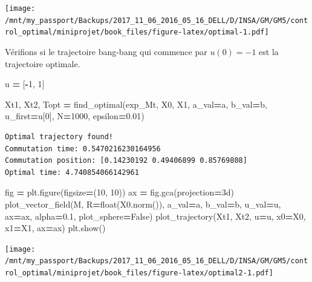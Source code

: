 \documentclass[
  french,
]{article}
\newenvironment{Shaded}{\begin{snugshade}}{\end{snugshade}}
\newcommand{\BuiltInTok}[1]{#1}
\newcommand{\DecValTok}[1]{\textcolor[rgb]{0.00,0.00,0.81}{#1}}
\newcommand{\FloatTok}[1]{\textcolor[rgb]{0.00,0.00,0.81}{#1}}
\newcommand{\NormalTok}[1]{#1}
\newcommand{\OperatorTok}[1]{\textcolor[rgb]{0.81,0.36,0.00}{\textbf{#1}}}
\newcommand{\StringTok}[1]{\textcolor[rgb]{0.31,0.60,0.02}{#1}}
\newcommand{\VariableTok}[1]{\textcolor[rgb]{0.00,0.00,0.00}{#1}}
\begin{document}
\texttt{[image: /mnt/my\_passport/Backups/2017\_11\_06\_2016\_05\_16\_DELL/D/INSA/GM/GM5/control\_optimal/miniprojet/book\_files/figure-latex/optimal-1.pdf]}

Vérifions si le trajectoire bang-bang qui commence par \(u(0)=-1\)
est la trajectoire optimale.

\begin{Shaded}
\begin{Highlighting}[]
\NormalTok{u }\OperatorTok{=}\NormalTok{ [}\OperatorTok{{-}}\DecValTok{1}\NormalTok{, }\DecValTok{1}\NormalTok{]}

\NormalTok{Xt1, Xt2, Topt }\OperatorTok{=}\NormalTok{ find\_optimal(exp\_Mt, X0, X1, a\_val}\OperatorTok{=}\NormalTok{a, b\_val}\OperatorTok{=}\NormalTok{b, u\_first}\OperatorTok{=}\NormalTok{u[}\DecValTok{0}\NormalTok{], N}\OperatorTok{=}\DecValTok{1000}\NormalTok{, epsilon}\OperatorTok{=}\FloatTok{0.01}\NormalTok{)}
\end{Highlighting}
\end{Shaded}

\begin{verbatim}
Optimal trajectory found!
Commutation time: 0.5470216230164956
Commutation position: [0.14230192 0.49406899 0.85769808]
Optimal time: 4.740854066142961
\end{verbatim}

\begin{Shaded}
\begin{Highlighting}[]
\NormalTok{fig }\OperatorTok{=}\NormalTok{ plt.figure(figsize}\OperatorTok{=}\NormalTok{(}\DecValTok{10}\NormalTok{, }\DecValTok{10}\NormalTok{))}
\NormalTok{ax }\OperatorTok{=}\NormalTok{ fig.gca(projection}\OperatorTok{=}\StringTok{\textquotesingle{}3d\textquotesingle{}}\NormalTok{)}
\NormalTok{plot\_vector\_field(M, R}\OperatorTok{=}\BuiltInTok{float}\NormalTok{(X0.norm()), a\_val}\OperatorTok{=}\NormalTok{a, b\_val}\OperatorTok{=}\NormalTok{b, u\_val}\OperatorTok{=}\NormalTok{u, ax}\OperatorTok{=}\NormalTok{ax, alpha}\OperatorTok{=}\FloatTok{0.1}\NormalTok{, plot\_sphere}\OperatorTok{=}\VariableTok{False}\NormalTok{)}
\NormalTok{plot\_trajectory(Xt1, Xt2, u}\OperatorTok{=}\NormalTok{u, x0}\OperatorTok{=}\NormalTok{X0, x1}\OperatorTok{=}\NormalTok{X1, ax}\OperatorTok{=}\NormalTok{ax)}
\NormalTok{plt.show()}
\end{Highlighting}
\end{Shaded}

\texttt{[image: /mnt/my\_passport/Backups/2017\_11\_06\_2016\_05\_16\_DELL/D/INSA/GM/GM5/control\_optimal/miniprojet/book\_files/figure-latex/optimal2-1.pdf]}
\end{document}
